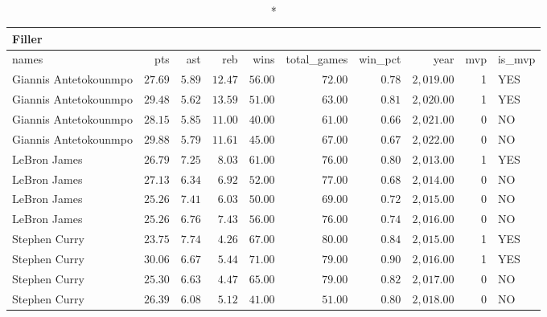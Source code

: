 \begin{longtable}{lrrrrrrrrl}
\caption*{
{\large Filler}
} \\ 
\toprule
names & pts & ast & reb & wins & total\_games & win\_pct & year & mvp & is\_mvp \\ 
\midrule
Giannis Antetokounmpo & $27.69$ & $5.89$ & $12.47$ & $56.00$ & $72.00$ & $0.78$ & $2,019.00$ & 1 & YES \\ 
Giannis Antetokounmpo & $29.48$ & $5.62$ & $13.59$ & $51.00$ & $63.00$ & $0.81$ & $2,020.00$ & 1 & YES \\ 
Giannis Antetokounmpo & $28.15$ & $5.85$ & $11.00$ & $40.00$ & $61.00$ & $0.66$ & $2,021.00$ & 0 & NO \\ 
Giannis Antetokounmpo & $29.88$ & $5.79$ & $11.61$ & $45.00$ & $67.00$ & $0.67$ & $2,022.00$ & 0 & NO \\ 
LeBron James & $26.79$ & $7.25$ & $8.03$ & $61.00$ & $76.00$ & $0.80$ & $2,013.00$ & 1 & YES \\ 
LeBron James & $27.13$ & $6.34$ & $6.92$ & $52.00$ & $77.00$ & $0.68$ & $2,014.00$ & 0 & NO \\ 
LeBron James & $25.26$ & $7.41$ & $6.03$ & $50.00$ & $69.00$ & $0.72$ & $2,015.00$ & 0 & NO \\ 
LeBron James & $25.26$ & $6.76$ & $7.43$ & $56.00$ & $76.00$ & $0.74$ & $2,016.00$ & 0 & NO \\ 
Stephen Curry & $23.75$ & $7.74$ & $4.26$ & $67.00$ & $80.00$ & $0.84$ & $2,015.00$ & 1 & YES \\ 
Stephen Curry & $30.06$ & $6.67$ & $5.44$ & $71.00$ & $79.00$ & $0.90$ & $2,016.00$ & 1 & YES \\ 
Stephen Curry & $25.30$ & $6.63$ & $4.47$ & $65.00$ & $79.00$ & $0.82$ & $2,017.00$ & 0 & NO \\ 
Stephen Curry & $26.39$ & $6.08$ & $5.12$ & $41.00$ & $51.00$ & $0.80$ & $2,018.00$ & 0 & NO \\ 
\bottomrule
\end{longtable}

